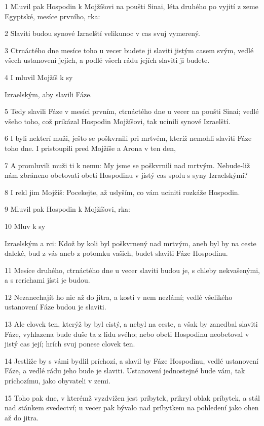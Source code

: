 \par 1 Mluvil pak Hospodin k Mojžíšovi na poušti Sinai, léta druhého po vyjití z zeme Egyptské, mesíce prvního, rka:
\par 2 Slaviti budou synové Izraelští velikunoc v cas svuj vymerený.
\par 3 Ctrnáctého dne mesíce toho u vecer budete ji slaviti jistým casem svým, vedlé všech ustanovení jejích, a podlé všech rádu jejích slaviti ji budete.
\par 4 I mluvil Mojžíš k sy\par Izraelským, aby slavili Fáze.
\par 5 Tedy slavili Fáze v mesíci prvním, ctrnáctého dne u vecer na poušti Sinai; vedlé všeho toho, což prikázal Hospodin Mojžíšovi, tak ucinili synové Izraelští.
\par 6 I byli nekterí muži, ješto se poškvrnili pri mrtvém, kteríž nemohli slaviti Fáze toho dne. I pristoupili pred Mojžíše a Arona v ten den,
\par 7 A promluvili muži ti k nemu: My jsme se poškvrnili nad mrtvým. Nebude-liž nám zbráneno obetovati obeti Hospodinu v jistý cas spolu s syny Izraelskými?
\par 8 I rekl jim Mojžíš: Pocekejte, až uslyším, co vám uciniti rozkáže Hospodin.
\par 9 Mluvil pak Hospodin k Mojžíšovi, rka:
\par 10 Mluv k sy\par Izraelským a rci: Kdož by koli byl poškvrnený nad mrtvým, aneb byl by na ceste daleké, bud z vás aneb z potomku vašich, budet slaviti Fáze Hospodinu.
\par 11 Mesíce druhého, ctrnáctého dne u vecer slaviti budou je, s chleby nekvašenými, a s rerichami jísti je budou.
\par 12 Nezanechajít ho nic až do jitra, a kosti v nem nezlámí; vedlé všelikého ustanovení Fáze budou je slaviti.
\par 13 Ale clovek ten, kterýž by byl cistý, a nebyl na ceste, a však by zanedbal slaviti Fáze, vyhlazena bude duše ta z lidu svého; nebo obeti Hospodinu neobetoval v jistý cas její; hrích svuj ponese clovek ten.
\par 14 Jestliže by s vámi bydlil príchozí, a slavil by Fáze Hospodinu, vedlé ustanovení Fáze, a vedlé rádu jeho bude je slaviti. Ustanovení jednostejné bude vám, tak príchozímu, jako obyvateli v zemi.
\par 15 Toho pak dne, v kterémž vyzdvižen jest príbytek, prikryl oblak príbytek, a stál nad stánkem svedectví; u vecer pak bývalo nad príbytkem na pohledení jako ohen až do jitra.
